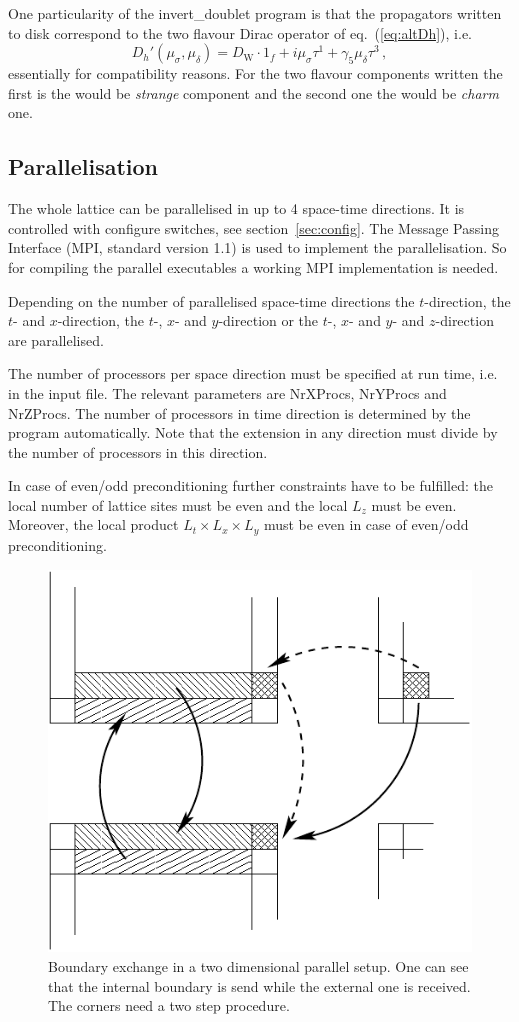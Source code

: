 One particularity of the {\ttfamily invert\_doublet} program is that
the propagators written to disk correspond to the two flavour Dirac
operator of eq.~(\ref{eq:altDh}), i.e.
\[
D_h'(\mu_\sigma,\mu_\delta) = D_\mathrm{W}\cdot 1_f +
i\mu_\sigma\tau^1 + \gamma_5 \mu_\delta \tau^3\, ,
\]
essentially for compatibility reasons. For the two flavour components
written the first is the would be \emph{strange} component and the
second one the would be \emph{charm} one.                             

\subsection{Parallelisation}

The whole lattice can be parallelised in up to 4 space-time directions.
It is controlled with configure switches, see section~\ref{sec:config}.
The Message Passing Interface (MPI, standard version 1.1)  is used to
implement the parallelisation. So for compiling the parallel
executables a working MPI implementation is needed.

Depending on the number of parallelised space-time directions the
$t$-direction, the $t$- and $x$-direction, the $t$-, $x$- and
$y$-direction or the $t$-, $x$- and $y$- and $z$-direction are
parallelised. 

The number of processors per space direction must be specified at run time,
i.e. in the input file. The relevant parameters are {\ttfamily
  NrXProcs}, {\ttfamily NrYProcs} and {\ttfamily NrZProcs}. The number
of processors in time direction is determined by the program
automatically. Note that the extension in any direction must divide by
the number of processors in this direction. 

In case of even/odd preconditioning further constraints have to be
fulfilled: the local number of lattice sites must be even and the
local $L_z$ must be even. Moreover, the local product $L_t\times L_x
\times L_y$ must be even in case of even/odd preconditioning. 


\begin{figure}[htbp]
\centering
\includegraphics[width=0.65\linewidth]{partition}
\caption{Boundary exchange in a two dimensional parallel setup. One
  can see that the internal boundary is send while the external one
  is received. The corners need a two step procedure.}
\label{fig:partition}
\end{figure}

